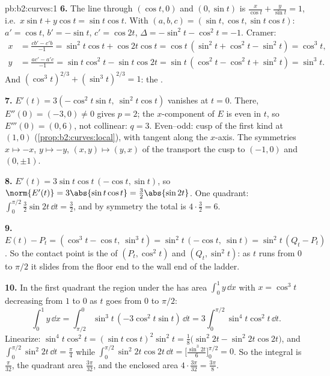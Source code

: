 \begin{solution}{pb:b2:curves:1}
\textbf{6.} The line through $(\cos t, 0)$ and $(0, \sin t)$
is $\frac x{\cos t} + \frac y{\sin t} = 1$, i.e.\ $x\sin t +
y\cos t = \sin t\cos t$. With $(a, b, c) = (\sin t, \cos t,
\sin t\cos t)$: $a' = \cos t$, $b' = -\sin t$, $c' = \cos
2t$, $\Delta = -\sin^2 t - \cos^2 t = -1$. Cramer:
\begin{align*}
x &= \frac{cb' - c'b}{-1} = \sin^2 t\cos t + \cos 2t\cos t
= \cos t\,(\sin^2 t + \cos^2 t - \sin^2 t) = \cos^3 t,\\
y &= \frac{ac' - a'c}{-1} = \sin t\cos^2 t - \sin t\cos 2t
= \sin t\,(\cos^2 t - \cos^2 t + \sin^2 t) = \sin^3 t .
\end{align*}
And $(\cos^3t)^{2/3} + (\sin^3t)^{2/3} = 1$: the .

\textbf{7.} $E'(t) = 3(-\cos^2 t\sin t,\ \sin^2 t\cos t)$
vanishes at $t = 0$. There, $E''(0) = (-3, 0) \neq 0$ gives
$p = 2$; the $x$-component of $E$ is even in $t$, so
$E'''(0) = (0, 6)$, not collinear: $q = 3$. Even--odd: cusp
of the first kind at $(1, 0)$
(\cref{prop:b2:curves:local}), with tangent along the
$x$-axis. The symmetries $x \mapsto -x$, $y \mapsto -y$, $(x,
y) \mapsto (y, x)$ of the  transport the cusp to $(-1,
0)$ and $(0, \pm1)$.

\textbf{8.} $E'(t) = 3\sin t\cos t\,(-\cos t, \sin t)$, so
$\norm{E'(t)} = 3\abs{\sin t\cos t} = \tfrac32\abs{\sin 2t}$.
One quadrant: $\int_0^{\pi/2}\tfrac32\sin 2t\,\dd t =
\tfrac32$, and by symmetry the total  is $4 \cdot
\tfrac32 = 6$.

\textbf{9.} $E(t) - P_t = (\cos^3 t - \cos t,\ \sin^3 t) =
\sin^2 t\,(-\cos t,\ \sin t) = \sin^2 t\,(Q_t - P_t)$. So the
contact point is the  of $(P_t, \cos^2 t)$ and
$(Q_t, \sin^2 t)$: as $t$ runs from $0$ to $\pi/2$ it slides
from the floor end to the wall end of the ladder.

\textbf{10.} In the first quadrant the region under the
 has area $\int_0^1 y\,\dd x$ with $x = \cos^3 t$
decreasing from $1$ to $0$ as $t$ goes from $0$ to $\pi/2$:
\[
\int_0^1 y\,\dd x
= \int_{\pi/2}^{0}\sin^3 t\,(-3\cos^2 t\sin t)\,\dd t
= 3\int_0^{\pi/2}\sin^4 t\cos^2 t\,\dd t .
\]
Linearize: $\sin^4 t\cos^2 t = (\sin t\cos t)^2\sin^2 t =
\tfrac18\bigl(\sin^2 2t - \sin^2 2t\cos 2t\bigr)$, and
$\int_0^{\pi/2}\sin^2 2t\,\dd t = \tfrac\pi4$ while
$\int_0^{\pi/2}\sin^2 2t\cos 2t\,\dd t =
\bigl[\tfrac{\sin^3 2t}6\bigr]_0^{\pi/2} = 0$. So the
integral is $\tfrac\pi{32}$, the quadrant area
$\tfrac{3\pi}{32}$, and the enclosed area $4 \cdot
\tfrac{3\pi}{32} = \tfrac{3\pi}8$.


\end{solution}
